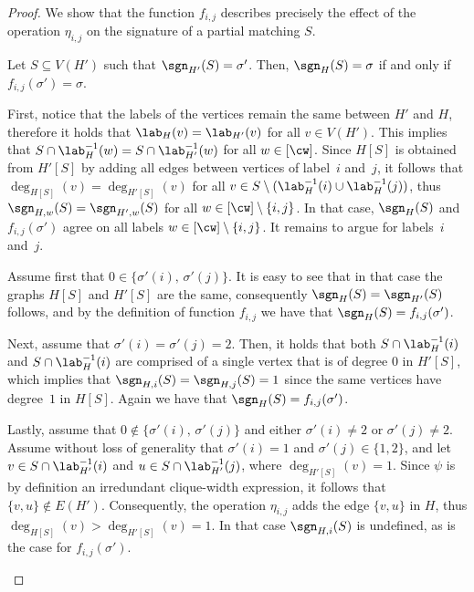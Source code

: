 \begin{proof}
    We show that the function $f_{i,j}$ describes precisely the effect of the operation $\eta_{i,j}$
    on the signature of a partial matching $S$.

    \begin{claim}\label{claim:induced:cw:join-correctness}
        Let $S \subseteq V(H')$ such that $\sgn_{H'}(S) = \sigma'$.
        Then, $\sgn_{H}(S) = \sigma$ if and only if $f_{i,j}(\sigma') = \sigma$.
    \end{claim}

    \begin{claimproof}
        First, notice that the labels of the vertices remain the same between $H'$ and $H$,
        therefore it holds that $\lab_H(v) = \lab_{H'}(v)$ for all $v \in V(H')$.
        This implies that $S \cap \lab^{-1}_H (w) = S \cap \lab^{-1}_{H'} (w)$ for all $w \in [\cw]$.
        Since $H[S]$ is obtained from $H'[S]$ by adding all edges between vertices of label~$i$ and~$j$,
        it follows that $\deg_{H[S]}(v) = \deg_{H'[S]}(v)$ for all $v \in S \setminus (\lab^{-1}_H(i) \cup \lab^{-1}_H(j))$,
        thus $\sgn_{H,w}(S) = \sgn_{H',w}(S)$ for all $w \in [\cw] \setminus \{i,j\}$.
        In that case, $\sgn_{H}(S)$ and $f_{i,j}(\sigma')$ agree on all labels $w \in [\cw] \setminus \{i,j\}$.
        It remains to argue for labels~$i$ and~$j$.

        Assume first that $0 \in \{\sigma'(i), \, \sigma'(j)\}$.
        It is easy to see that in that case the graphs $H[S]$ and $H'[S]$ are the same,
        consequently $\sgn_{H}(S) = \sgn_{H'}(S)$ follows, and by the definition of function $f_{i,j}$
        we have that $\sgn_{H}(S) = f_{i,j}(\sigma')$.

        Next, assume that $\sigma'(i) = \sigma'(j) = 2$.
        Then, it holds that both $S \cap \lab^{-1}_{H}(i)$ and $S \cap \lab^{-1}_{H}(i)$ are comprised of a single vertex
        that is of degree $0$ in $H'[S]$, which implies that $\sgn_{H,i}(S) = \sgn_{H,j}(S) = 1$
        since the same vertices have degree~$1$ in $H[S]$.
        Again we have that $\sgn_{H}(S) = f_{i,j}(\sigma')$.

        Lastly, assume that $0 \notin \{\sigma'(i), \, \sigma'(j)\}$ and either $\sigma'(i) \neq 2$ or $\sigma'(j) \neq 2$.
        Assume without loss of generality that $\sigma'(i) = 1$ and $\sigma'(j) \in \{1,2\}$,
        and let $v \in S \cap \lab^{-1}_{H'}(i)$ and $u \in S \cap \lab^{-1}_{H'}(j)$,
        where $\deg_{H'[S]}(v) = 1$.
        Since $\psi$ is by definition an irredundant clique-width expression,
        it follows that $\{v,u\} \notin E(H')$.
        Consequently, the operation $\eta_{i,j}$ adds the edge $\{v,u\}$ in $H$, thus $\deg_{H[S]}(v) > \deg_{H'[S]}(v) = 1$.
        In that case $\sgn_{H,i}(S)$ is undefined, as is the case for $f_{i,j}(\sigma')$.
    \end{claimproof}


\end{proof}
